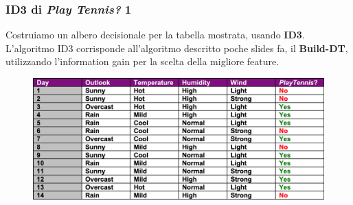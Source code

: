 \begin{frame}
	
	\frametitle{ID3 di \textit{Play Tennis?} 1}

	Costruiamo un albero decisionale per la tabella mostrata, usando \textbf{ID3}.\\
	L'algoritmo ID3 corrisponde all'algoritmo descritto poche slides fa, il \textbf{Build-DT}, utilizzando l'information gain per la scelta della migliore feature.
	
	\begin{figure}[!htbp]
		\centering
		\includegraphics[width=1.00\linewidth]{images/supervised/decision_trees/example_play_tennis.png}
	\end{figure}
	
\end{frame}


